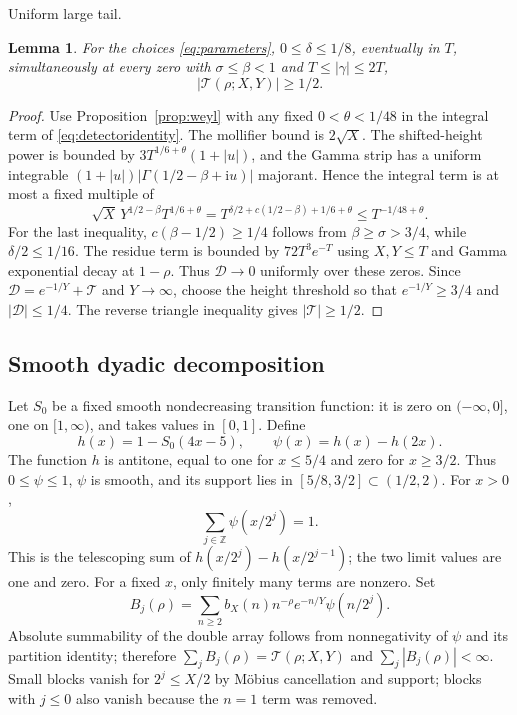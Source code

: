 \documentclass[11pt,a4paper]{article}
\numberwithin{equation}{section}
\newtheorem{lemma}[theorem]{Lemma}
\theoremstyle{definition}
\newcommand{\Z}{\mathbb Z}
\newcommand{\ii}{\mathrm i}
\begin{document}
\par\medskip\noindent Uniform large tail.
\begin{lemma}\label{lem:largetail}
For the choices \eqref{eq:parameters}, $0\le\delta\le1/8$, eventually in
$T$, simultaneously at every zero with
$\sigma\le\beta<1$ and $T\le|\gamma|\le2T$,
\[
 |\mathcal T(\rho;X,Y)|\ge1/2.
\]
\end{lemma}
\begin{proof}
Use Proposition~\ref{prop:weyl} with any fixed $0<\theta<1/48$ in the
integral term of \eqref{eq:detectoridentity}. The mollifier bound is
$2\sqrt X$. The shifted-height power is bounded by
$3T^{1/6+\theta}(1+|u|)$, and the Gamma strip has a uniform integrable
$(1+|u|)|\Gamma(1/2-\beta+\ii u)|$ majorant. Hence the integral term is
at most a fixed multiple of
\[
 \sqrt X\,Y^{1/2-\beta}T^{1/6+\theta}
       =T^{\delta/2+c(1/2-\beta)+1/6+\theta}
       \le T^{-1/48+\theta}.
\]
For the last inequality, $c(\beta-1/2)\ge1/4$ follows from
$\beta\ge\sigma>3/4$, while $\delta/2\le1/16$.
The residue term is bounded by $72T^3e^{-T}$ using $X,Y\le T$ and Gamma
exponential decay at $1-\rho$. Thus $\mathcal D\to0$ uniformly over these
zeros. Since $\mathcal D=e^{-1/Y}+\mathcal T$ and $Y\to\infty$,
choose the height threshold so that $e^{-1/Y}\ge3/4$ and
$|\mathcal D|\le1/4$. The reverse triangle inequality gives
$|\mathcal T|\ge1/2$.
\end{proof}

\subsection{Smooth dyadic decomposition}
Let $S_0$ be a fixed smooth nondecreasing transition function: it is zero
on $(-\infty,0]$, one on $[1,\infty)$, and takes values in $[0,1]$.
Define
\[
 h(x)=1-S_0(4x-5),\qquad\psi(x)=h(x)-h(2x).
\]
The function $h$ is antitone, equal to one for $x\le5/4$ and zero for
$x\ge3/2$. Thus $0\le\psi\le1$, $\psi$ is smooth, and its support lies
in $[5/8,3/2]\subset(1/2,2)$. For $x>0$,
\[
 \sum_{j\in\Z}\psi(x/2^j)=1.
\]
This is the telescoping sum of $h(x/2^j)-h(x/2^{j-1})$; the two limit
values are one and zero. For a fixed $x$, only finitely many terms are nonzero.
Set
\[
 B_j(\rho)=\sum_{n\ge2}b_X(n)n^{-\rho}e^{-n/Y}\psi(n/2^j).
\]
Absolute summability of the double array follows from nonnegativity of $\psi$
and its partition identity; therefore
$\sum_jB_j(\rho)=\mathcal T(\rho;X,Y)$ and $\sum_j|B_j(\rho)|<\infty$.
Small blocks vanish for $2^j\le X/2$ by M\"obius cancellation and support;
blocks with $j\le0$ also vanish because the $n=1$ term was removed.
\end{document}
